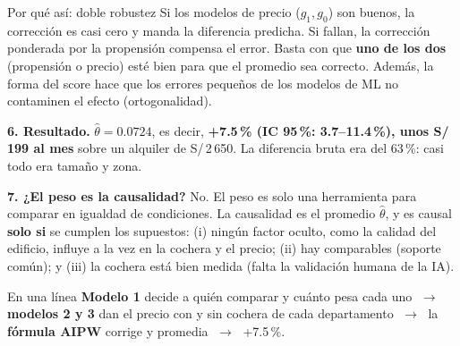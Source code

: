 \documentclass[10pt,a4paper]{article}
\begin{document}
\begin{caja}{Por qué así: doble robustez}
Si los modelos de precio ($g_1,g_0$) son buenos, la corrección es casi cero y manda la diferencia predicha. Si fallan, la corrección ponderada por la propensión compensa el error. Basta con que \textbf{uno de los dos} (propensión o precio) esté bien para que el promedio sea correcto. Además, la forma del score hace que los errores pequeños de los modelos de ML no contaminen el efecto (ortogonalidad).
\end{caja}

\textbf{6. Resultado.} $\hat\theta=0.0724$, es decir, \textbf{+7.5\,\% (IC 95\,\%: 3.7--11.4\,\%), unos S/\,199 al mes} sobre un alquiler de S/\,2\,650. La diferencia bruta era del 63\,\%: casi todo era tamaño y zona.

\textbf{7. ¿El peso es la causalidad?} No. El peso es solo una herramienta para comparar en igualdad de condiciones. La causalidad es el promedio $\hat\theta$, y es causal \textbf{solo si} se cumplen los supuestos: (i) ningún factor oculto, como la calidad del edificio, influye a la vez en la cochera y el precio; (ii) hay comparables (soporte común); y (iii) la cochera está bien medida (falta la validación humana de la IA).

\begin{caja}{En una línea}
\textbf{Modelo 1} decide a quién comparar y cuánto pesa cada uno $\;\rightarrow\;$ \textbf{modelos 2 y 3} dan el precio con y sin cochera de cada departamento $\;\rightarrow\;$ la \textbf{fórmula AIPW} corrige y promedia $\;\rightarrow\;$ +7.5\,\%.
\end{caja}
\end{document}
